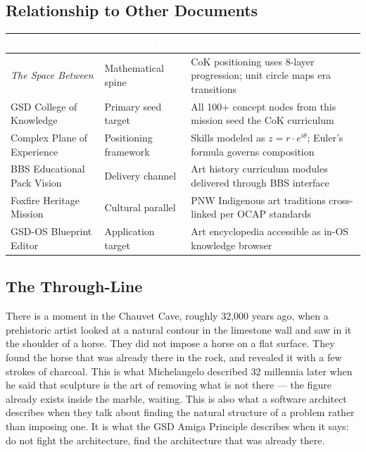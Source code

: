 \documentclass[11pt,letterpaper]{article}
\newcommand{\tableheader}[1]{\textbf{\sffamily\textcolor{white}{#1}}}
\begin{document}
\subsection{Relationship to Other Documents}

\begin{tabularx}{\textwidth}{L{4cm}L{4cm}X}
\toprule
{}
\tableheader{Document} & \tableheader{Relationship} & \tableheader{Notes} \\
\midrule
\emph{The Space Between} & Mathematical spine & CoK positioning uses 8-layer progression; unit circle maps era transitions \\
GSD College of Knowledge & Primary seed target & All 100+ concept nodes from this mission seed the CoK curriculum \\
Complex Plane of Experience & Positioning framework & Skills modeled as $z = r \cdot e^{i\theta}$; Euler's formula governs composition \\
BBS Educational Pack Vision & Delivery channel & Art history curriculum modules delivered through BBS interface \\
Foxfire Heritage Mission & Cultural parallel & PNW Indigenous art traditions cross-linked per OCAP standards \\
GSD-OS Blueprint Editor & Application target & Art encyclopedia accessible as in-OS knowledge browser \\
\bottomrule
\end{tabularx}

\subsection{The Through-Line}

There is a moment in the Chauvet Cave, roughly 32,000 years ago, when a prehistoric artist looked at a natural contour in the limestone wall and saw in it the shoulder of a horse. They did not impose a horse on a flat surface. They found the horse that was already there in the rock, and revealed it with a few strokes of charcoal. This is what Michelangelo described 32 millennia later when he said that sculpture is the art of removing what is not there --- the figure already exists inside the marble, waiting. This is also what a software architect describes when they talk about finding the natural structure of a problem rather than imposing one. It is what the GSD Amiga Principle describes when it says: do not fight the architecture, find the architecture that was already there.
\end{document}
